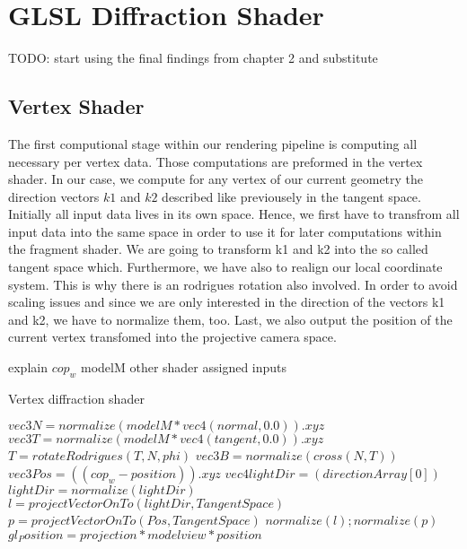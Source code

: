 \section{GLSL Diffraction Shader}
TODO: start using the final findings from chapter 2 and substitute

\subsection{Vertex Shader}
The first computional stage within our rendering pipeline is computing all necessary per vertex data. Those computations are preformed in the vertex shader. In our case, we compute for any vertex of our current geometry the direction vectors $k1$ and $k2$ described like previousely in the tangent space. Initially all input data lives in its own space. Hence, we first have to transfrom all input data into the same space in order to use it for later computations within the fragment shader. We are going to transform k1 and k2 into the so called tangent space which. Furthermore, we have also to realign our local coordinate system. This is why there is an rodrigues rotation also involved. In order to avoid scaling issues and since we are only interested in the direction of the vectors k1 and k2, we have to normalize them, too. Last, we also output the position of the current vertex transfomed into the projective camera space.
  
explain $cop_w$
modelM
other shader assigned inputs

\begin{algorithm}[H]
  \caption{Vertex diffraction shader}
  \begin{algorithmic}
      \State $ vec3 N = normalize(modelM * vec4(normal,0.0)).xyz$
      \State $ vec3 T = normalize(modelM * vec4(tangent,0.0)).xyz$
      \State $ T = rotateRodrigues(T, N, phi)$
      \State $ vec3 B = normalize(cross(N, T))$
      \State $ vec3 Pos = ((cop_w-position)).xyz$
      \State $ vec4 lightDir = (directionArray[0])$
      \State $ lightDir = normalize(lightDir)$
      \State $ l = projectVectorOnTo(lightDir, TangentSpace)$
      \State $ p = projectVectorOnTo(Pos, TangentSpace)$
      \State $normalize(l); normalize(p)$
      \State $gl_Position = projection * modelview * position$
    \EndFor
  \end{algorithmic}
\end{algorithm}


